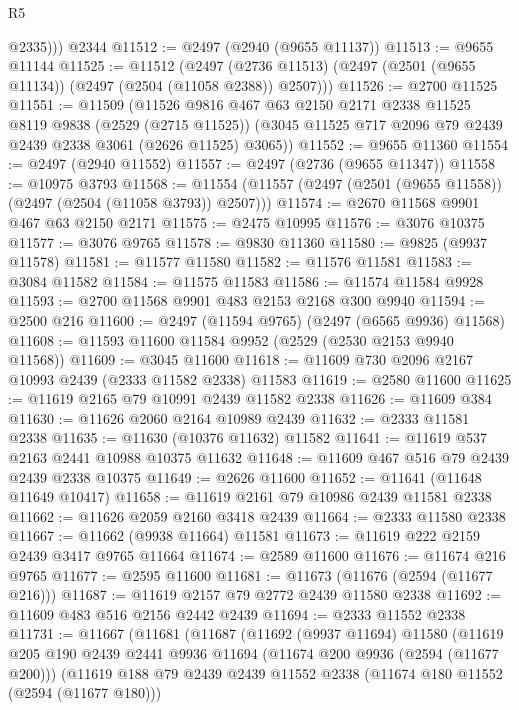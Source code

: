 \begin{lexlean}{R5}
\begin{coremodule}
          @2335)))
    @2344
@11512 := @2497 (@2940 (@9655 @11137))
@11513 := @9655 @11144
@11525 := @11512
    (@2497 (@2736 @11513) (@2497 (@2501 (@9655 @11134)) (@2497 (@2504 (@11058 @2388)) @2507)))
@11526 := @2700 @11525
@11551 := @11509
    (@11526
      @9816
      @467
      @63
      @2150
      @2171
      @2338
      @11525
      @8119
      @9838
      (@2529 (@2715 @11525))
      (@3045 @11525 @717 @2096 @79 @2439 @2439 @2338 @3061 (@2626 @11525) @3065))
@11552 := @9655 @11360
@11554 := @2497 (@2940 @11552)
@11557 := @2497 (@2736 (@9655 @11347))
@11558 := @10975 @3793
@11568 := @11554 (@11557 (@2497 (@2501 (@9655 @11558)) (@2497 (@2504 (@11058 @3793)) @2507)))
@11574 := @2670 @11568 @9901 @467 @63 @2150 @2171
@11575 := @2475 @10995
@11576 := @3076 @10375
@11577 := @3076 @9765
@11578 := @9830 @11360
@11580 := @9825 (@9937 @11578)
@11581 := @11577 @11580
@11582 := @11576 @11581
@11583 := @3084 @11582
@11584 := @11575 @11583
@11586 := @11574 @11584 @9928
@11593 := @2700 @11568 @9901 @483 @2153 @2168 @300 @9940
@11594 := @2500 @216
@11600 := @2497 (@11594 @9765) (@2497 (@6565 @9936) @11568)
@11608 := @11593 @11600 @11584 @9952 (@2529 (@2530 @2153 @9940 @11568))
@11609 := @3045 @11600
@11618 := @11609 @730 @2096 @2167 @10993 @2439 (@2333 @11582 @2338) @11583
@11619 := @2580 @11600
@11625 := @11619 @2165 @79 @10991 @2439 @11582 @2338
@11626 := @11609 @384
@11630 := @11626 @2060 @2164 @10989 @2439
@11632 := @2333 @11581 @2338
@11635 := @11630 (@10376 @11632) @11582
@11641 := @11619 @537 @2163 @2441 @10988 @10375 @11632
@11648 := @11609 @467 @516 @79 @2439 @2439 @2338 @10375
@11649 := @2626 @11600
@11652 := @11641 (@11648 @11649 @10417)
@11658 := @11619 @2161 @79 @10986 @2439 @11581 @2338
@11662 := @11626 @2059 @2160 @3418 @2439
@11664 := @2333 @11580 @2338
@11667 := @11662 (@9938 @11664) @11581
@11673 := @11619 @222 @2159 @2439 @3417 @9765 @11664
@11674 := @2589 @11600
@11676 := @11674 @216 @9765
@11677 := @2595 @11600
@11681 := @11673 (@11676 (@2594 (@11677 @216)))
@11687 := @11619 @2157 @79 @2772 @2439 @11580 @2338
@11692 := @11609 @483 @516 @2156 @2442 @2439
@11694 := @2333 @11552 @2338
@11731 := @11667
    (@11681
      (@11687
        (@11692
          (@9937 @11694)
          @11580
          (@11619
            @205
            @190
            @2439
            @2441
            @9936
            @11694
            (@11674 @200 @9936 (@2594 (@11677 @200)))
            (@11619
              @188
              @79
              @2439
              @2439
              @11552
              @2338
              (@11674 @180 @11552 (@2594 (@11677 @180)))

\end{coremodule}
\end{lexlean}
